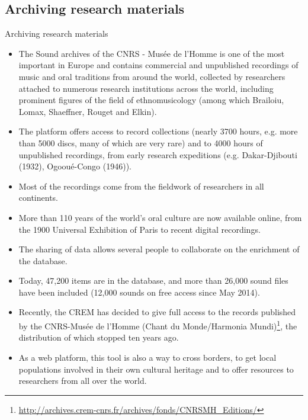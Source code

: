 \documentclass[final, hyperref, table]{beamer}
\begin{document}
\subsection{ Archiving research materials}
\begin{frame}{ Archiving research materials}
  \begin{itemize}
  \item The Sound archives of the CNRS - Musée de l'Homme is one of
    the most important in Europe and contains commercial and
    unpublished recordings of music and oral traditions from around
    the world, collected by researchers attached to numerous research
    institutions across the world, including prominent figures of the
    field of ethnomusicology (among which Brailoiu, Lomax, Shaeffner,
    Rouget and Elkin).


  \item The platform offers access to record collections (nearly 3700
    hours, e.g. more than 5000 discs, many of which are very rare) and
    to 4000 hours of unpublished recordings, from early research
    expeditions (e.g. Dakar-Djibouti (1932), Ogooué-Congo
    (1946)).
  \item Most of the recordings come from the fieldwork of
    researchers in \alert{all continents}.
  \item More than \alert{110 years} of the world's
    oral culture are now available online, from the 1900 Universal
    Exhibition of Paris to recent digital recordings.
  \item The sharing of
    data allows several people to collaborate on the enrichment of the
    database.
  \item Today, 47,200 items are in the database, and more than
    26,000 sound files have been included (12,000 sounds on free
    access since May 2014).
  \item Recently, the CREM has decided to give
    full access to the records published by the CNRS-Musée de l’Homme
    (Chant du Monde/Harmonia
    Mundi)\footnote{\url{http://archives.crem-cnrs.fr/archives/fonds/CNRSMH_Editions/}},
    the distribution of which stopped ten years ago.
  \item As a web
    platform, this tool is also a way to cross borders, to get local
    populations involved in their own cultural heritage and to offer
    resources to researchers from all over the world.
  \end{itemize}

\end{frame}
\end{document}
